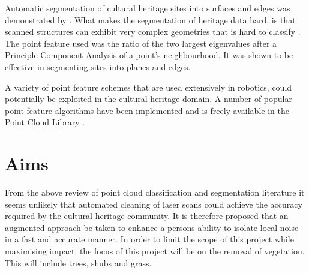 \documentclass[10pt,twocolumn]{article}
\begin{document}
Automatic segmentation of cultural heritage sites into surfaces and edges was demonstrated by \citep{Spina2010}. What makes the segmentation of heritage data hard, is that scanned structures can exhibit very complex geometries that is hard to classify \cite{Spina2010}. The point feature used was the ratio of the two largest eigenvalues after a Principle Component Analysis of a point's neighbourhood. It was shown to be effective in segmenting sites into planes and edges.

A variety of point feature schemes that are used extensively in robotics, could potentially be exploited in the cultural heritage domain. A number of popular point feature algorithms have been implemented and is freely available in the Point Cloud Library \cite{Rusu2011}.







\section{Aims}
From the above review of point cloud classification and segmentation literature it seems unlikely that automated cleaning of laser scans could achieve the accuracy required by the cultural heritage community. It is therefore proposed that an augmented approach be taken to enhance a persons ability to isolate local noise in a fast and accurate manner. In order to limit the scope of this project while maximising impact, the focus of this project will be on the removal of vegetation. This will include trees, shubs and grass.
\end{document}
